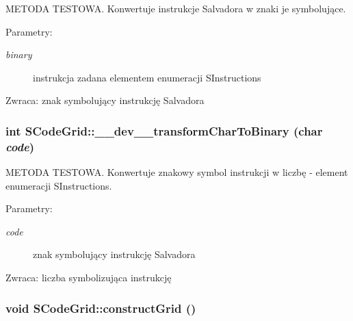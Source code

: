METODA TESTOWA. Konwertuje instrukcje Salvadora w znaki je symbolujące. \begin{Desc}
\item[Parametry:]
\begin{description}
\item[{\em binary}]instrukcja zadana elementem enumeracji SInstructions \end{description}
\end{Desc}
\begin{Desc}
\item[Zwraca:]znak symbolujący instrukcję Salvadora \end{Desc}
\hypertarget{classSCodeGrid_c5754181e1266e23935d84f3beeb5979}{
\subsubsection[{\_\-\_\-dev\_\-\_\-transformCharToBinary}]{\setlength{\rightskip}{0pt plus 5cm}int SCodeGrid::\_\-\_\-dev\_\-\_\-transformCharToBinary (char {\em code})}}
\label{classSCodeGrid_c5754181e1266e23935d84f3beeb5979}


METODA TESTOWA. Konwertuje znakowy symbol instrukcji w liczbę - element enumeracji SInstructions. \begin{Desc}
\item[Parametry:]
\begin{description}
\item[{\em code}]znak symbolujący instrukcję Salvadora \end{description}
\end{Desc}
\begin{Desc}
\item[Zwraca:]liczba symbolizująca instrukcję \end{Desc}
\hypertarget{classSCodeGrid_f15ba156433f88a40887e5ba72d9201a}{
\subsubsection[{constructGrid}]{\setlength{\rightskip}{0pt plus 5cm}void SCodeGrid::constructGrid ()}}
\label{classSCodeGrid_f15ba156433f88a40887e5ba72d9201a}


